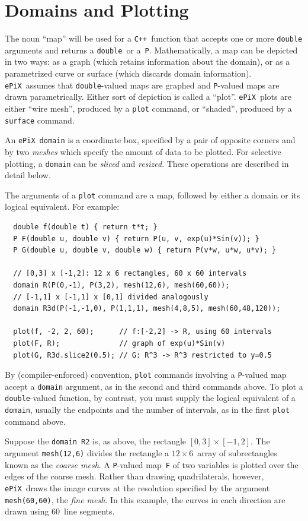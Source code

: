 \documentclass[12pt]{report}
\newcommand{\code}[1]{\texttt{#1}}
\newcommand{\ePiX}{\code{ePiX}}
\newcommand{\CXX}{\code{C++}}
\begin{document}
\section{Domains and Plotting}

 The noun ``map'' will be used for a \CXX\
function that accepts one or more \code{double} arguments and returns
a \code{double}~or a~\code{P}. Mathematically, a map can be depicted
in two ways: as a graph (which retains information about the domain),
or as a parametrized curve or surface (which discards domain
information). \ePiX\ assumes that \code{double}-valued maps are
graphed and \code{P}-valued maps are drawn parametrically. Either sort
of depiction is called a ``plot''.  \ePiX\ plots are either ``wire
mesh'', produced by a \code{plot} command, or ``shaded'', produced by
a \code{surface} command.

An \ePiX\ \code{domain} is a coordinate box, specified by a pair of
opposite corners and by two \emph{meshes} which specify the amount
of data to be plotted. For selective plotting, a \code{domain} can be
\emph{sliced} and \emph{resized}. These operations are described in
detail below.

The arguments of a \code{plot} command are a map, followed by either a
domain or its logical equivalent. For example:
\begin{verbatim}
  double f(double t) { return t*t; }
  P F(double u, double v) { return P(u, v, exp(u)*Sin(v)); }
  P G(double u, double v, double w) { return P(v*w, u*w, u*v); }

  // [0,3] x [-1,2]: 12 x 6 rectangles, 60 x 60 intervals
  domain R(P(0,-1), P(3,2), mesh(12,6), mesh(60,60));
  // [-1,1] x [-1,1] x [0,1] divided analogously
  domain R3d(P(-1,-1,0), P(1,1,1), mesh(4,8,5), mesh(60,48,120));

  plot(f, -2, 2, 60);      // f:[-2,2] -> R, using 60 intervals
  plot(F, R);              // graph of exp(u)*Sin(v)
  plot(G, R3d.slice2(0.5); // G: R^3 -> R^3 restricted to y=0.5
\end{verbatim}
By (compiler-enforced) convention, \code{plot} commands involving a
\code{P}-valued map accept a \code{domain} argument, as in the second
and third commands above. To plot a \code{double}-valued function, by
contrast, you must supply the logical equivalent of a \code{domain},
usually the endpoints and the number of intervals, as in the first
\code{plot} command above.

Suppose the \code{domain}~\code{R2} is, as above, the rectangle
$[0,3]\times[-1,2]$. The argument \code{mesh(12,6)} divides the
rectangle a $12\times6$~array of subrectangles known as the
\emph{coarse mesh}. A \code{P}-valued map~\code{F} of two variables is
plotted over the edges of the coarse mesh. Rather than drawing
quadrilaterals, however, \ePiX\ draws the image curves at the
resolution specified by the argument \code{mesh(60,60)}, the
\emph{fine mesh}. In this example, the curves in each direction are
drawn using 60~line segments.
\end{document}
